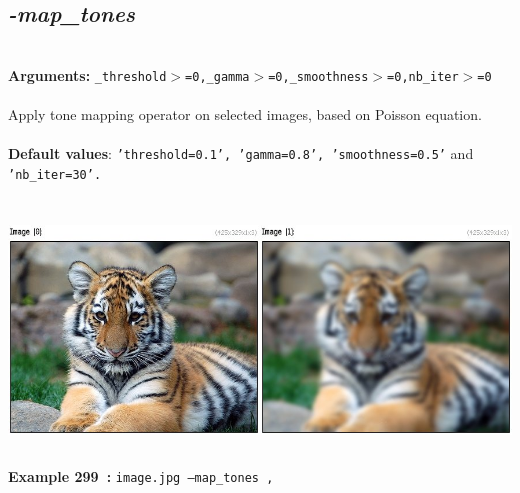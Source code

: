 \documentclass[a4paper,11pt,twoside]{book}
\begin{document}
\subsection{\emph{-map\_tones} }\vspace*{-0.5em}
~\\\textbf{Arguments: } 
{\small \texttt{\_threshold$>$=0,\_gamma$>$=0,\_smoothness$>$=0,nb\_iter$>$=0}}\\~\\
Apply tone mapping operator on selected images, based on Poisson equation.
~\\~\\\textbf{Default values}: {\small \texttt{'threshold=0.1', 'gamma=0.8', 'smoothness=0.5'} and \texttt{'nb\_iter=30'.}}
\begin{center}\includegraphics[keepaspectratio=true,height=7cm,width=\textwidth]{img/gmic_def299.jpg}\\
{\footnotesize \textbf{Example 299~:} \texttt{image.jpg --map\_tones ,}}
\end{center}
\end{document}

